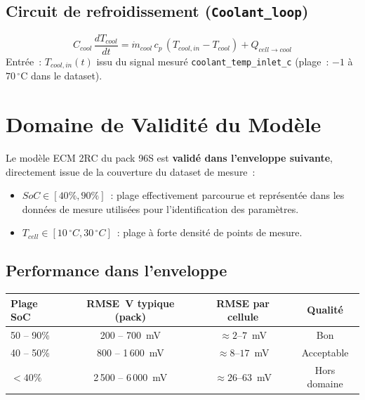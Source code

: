 \documentclass[a4paper,11pt]{article}
\begin{document}
\subsection{Circuit de refroidissement (\texttt{Coolant\_loop})}

\[
  C_{cool}\,\frac{dT_{cool}}{dt}
  = \dot{m}_{cool}\,c_p\,(T_{cool,in} - T_{cool}) + Q_{cell \to cool}
\]
Entrée~: $T_{cool,in}(t)$ issu du signal mesuré \texttt{coolant\_temp\_inlet\_c}
(plage~: $-1$ à $70\,^\circ$C dans le dataset).

\section{Domaine de Validité du Modèle}

\begin{validbox}
Le modèle ECM 2RC du pack 96S est \textbf{validé dans l'enveloppe suivante},
directement issue de la couverture du dataset de mesure~:
\begin{itemize}[nosep]
  \item $SoC \in [40\%, 90\%]$~: plage effectivement parcourue et représentée
    dans les données de mesure utilisées pour l'identification des paramètres.
  \item $T_{cell} \in [10\,^\circ C, 30\,^\circ C]$~: plage à forte densité de
    points de mesure.
\end{itemize}
\end{validbox}

\subsection{Performance dans l'enveloppe}

\begin{center}
\renewcommand{\arraystretch}{1.4}
\begin{tabular}{lccc}
\toprule
\textbf{Plage SoC} & \textbf{RMSE~V typique (pack)} & \textbf{RMSE par cellule} & \textbf{Qualité} \\
\midrule
50 -- 90\% & 200 -- 700~mV & $\approx 2$--$7$~mV & Bon \\
40 -- 50\% & 800 -- 1\,600~mV & $\approx 8$--$17$~mV & Acceptable \\
$<40\%$ & 2\,500 -- 6\,000~mV & $\approx 26$--$63$~mV & Hors domaine \\
\bottomrule
\end{tabular}
\end{center}
\end{document}
